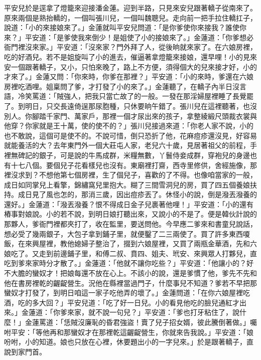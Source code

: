 平安兒於是逕拿了燈籠來迎接潘金蓮。迎到半路，只見來安兒跟著轎子從南來了。原來兩個是熟抬轎的，一個叫張川兒，一個叫魏聰兒。走向前一把手拉住轎扛子，說道：「小的來接娘來了。」金蓮就叫平安兒問道：「是你爹使你來接我？誰使你來？」平安道：「是爹使我來倒少！是姐使了小的接娘來了。」金蓮道：「你爹想必衙門裡沒來家。」平安道：「沒來家？門外拜了人，從後晌就來家了。在六娘房裡，吃的好酒兒。若不是姐旋叫了小的進去，催逼著拿燈籠來接娘，還早哩！小的見來安一個跟著轎子，又小，只怕來晚了，路上不方便，須得個大的兒來接才好，小的才來了。」金蓮又問：「你來時，你爹在那裡？」平安道：「小的來時，爹還在六娘房裡吃酒哩。姐稟問了爹，才打發了小的來了。」金蓮聽了，在轎子內半日沒言語，冷笑罵道：「賊強人，把我只當亡故了的一般。一發在那淫婦屋裡睡了長覺罷了。到明日，只交長遠倚逞那尿胞種，只休要晌午錯了。張川兒在這裡聽著，也沒別人。你腳踏千家門、萬家戶，那裡一個才尿出來的孩子，拿整綾緞尺頭裁衣裳與他穿？你家就是王十萬，使的使不的？」張川兒接過來道：「你老人家不說，小的也不敢說，這個可是使不的。不說可惜，倒只恐折了他，花麻痘疹還沒見，好容易就能養活的大？去年東門外一個大莊屯人家，老兒六十歲，見居著祖父的前程，手裡無碑記的銀子，可是說的牛馬成群，米糧無數，丫鬟侍妾成群，穿袍兒的身邊也有十七八個。要個兒子花看樣兒也沒有。東廟裡打齋，西寺里修供，舍經施像，那裡沒求到？不想他第七個房裡，生了個兒子，喜歡的了不得。也像咱當家的一般，成日如同掌兒上看擎，錦繡窩兒里抱大。糊了三間雪洞兒的房，買了四五個養娘扶持。成日見了風也怎的，那消三歲，因出痘疹丟了。休怪小的說，倒是潑丟潑養的還好。」金蓮道：「潑丟潑養？恨不得成日金子兒裹著他哩！」平安道：「小的還有樁事對娘說。小的若不說，到明日娘打聽出來，又說小的不是了。便是韓伙計說的那夥人，爹衙門裡都夾打了，收在監里，要送問他。今早應二爹來和書童兒說話，想必受了幾兩銀子，大包子拿到鋪子里，就便鑿了二三兩使了。買了許多東西嗄飯，在來興屋裡，教他媳婦子整治了，掇到六娘屋裡，又買了兩瓶金華酒，先和六娘吃了。又走到前邊鋪子里，和傅二叔、賁四、姐夫、玳安、來興眾人打夥兒，直吃到爹來家時分才散了。」金蓮道：「他就不讓你吃些？」平安道：「他讓小的？好不大膽的蠻奴才！把娘每還不放在心上。不該小的說，還是爹慣了他，爹先不先和他在書房裡乾的齷齪營生。況他在縣裡當過門子，什麼事兒不知道？爹若不早把那蠻奴才打發了，到明日咱這一家子吃他弄的壞了。」金蓮問道：「在你六娘屋裡吃酒，吃的多大回？」平安兒道：「吃了好一日兒。小的看見他吃的臉兒通紅才出來。」金蓮道：「你爹來家，就不說一句兒？」平安道：「爹也打牙粘住了，說什麼！」金蓮罵道：「恁賊沒廉恥的昏君強盜！賣了兒子招女婿，彼此騰倒著做。」囑咐平安：「等他再和那蠻奴才在那裡乾這齷齪營生，你就來告我說。」平安道：「娘吩咐，小的知道。娘也只放在心裡，休要題出小的一字兒來。」於是跟著轎子，直說到家門首。

